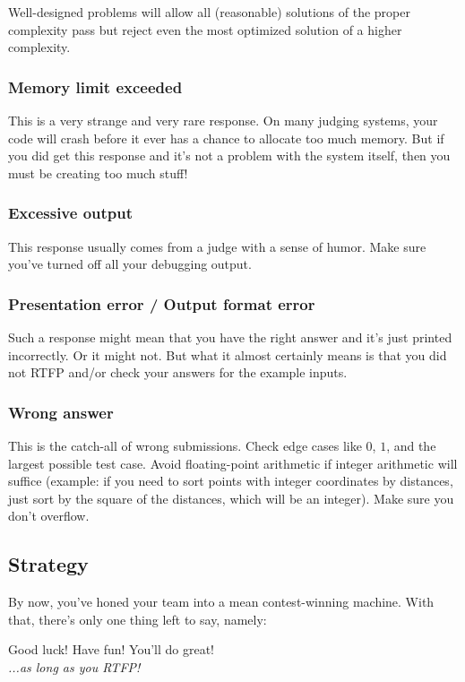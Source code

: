 \documentclass[a4paper,12pt]{article}
\begin{document}
Well-designed problems will allow all (reasonable) solutions of the proper complexity pass but reject even the most optimized solution of a higher complexity. 

\subsubsection{Memory limit exceeded}
This is a very strange and very rare response. On many judging systems, your code will crash before it ever has a chance to allocate too much memory. But if you did get this response and it's not a problem with the system itself, then you must be creating too much stuff! 

\subsubsection{Excessive output}
This response usually comes from a judge with a sense of humor. Make sure you've turned off all your debugging output.

\subsubsection{Presentation error / Output format error}
Such a response might mean that you have the right answer and it's just printed incorrectly. Or it might not. But what it almost certainly means is that you did not RTFP and/or check your answers for the example inputs.

\subsubsection{Wrong answer}
This is the catch-all of wrong submissions. Check edge cases like $0$, $1$, and the largest possible test case. Avoid floating-point arithmetic if integer arithmetic will suffice (example: if you need to sort points with integer coordinates by distances, just sort by the square of the distances, which will be an integer). Make sure you don't overflow.

\subsection{Strategy}
By now, you've honed your team into a mean contest-winning machine. With that, there's only one thing left to say, namely:\\[0.5cm]
\begin{center}
Good luck! Have fun! You'll do great!\\[0.5cm]
{\em ...as long as you RTFP!}
\end{center}
\end{document}
